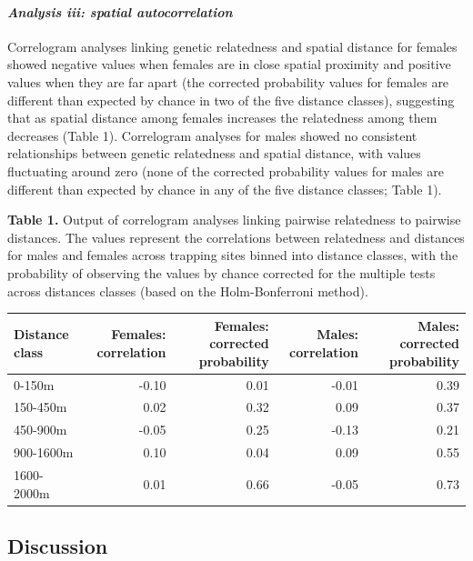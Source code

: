 \documentclass[]{article}
\let\oldparagraph\paragraph
\renewcommand{\paragraph}[1]{\oldparagraph{#1}\mbox{}}
\begin{document}
\hypertarget{analysis-iii-spatial-autocorrelation-1}{%
\paragraph{\texorpdfstring{\emph{Analysis iii: spatial
autocorrelation}}{Analysis iii: spatial autocorrelation}}\label{analysis-iii-spatial-autocorrelation-1}}

Correlogram analyses linking genetic relatedness and spatial distance
for females showed negative values when females are in close spatial
proximity and positive values when they are far apart (the corrected
probability values for females are different than expected by chance in
two of the five distance classes), suggesting that as spatial distance
among females increases the relatedness among them decreases (Table 1).
Correlogram analyses for males showed no consistent relationships
between genetic relatedness and spatial distance, with values
fluctuating around zero (none of the corrected probability values for
males are different than expected by chance in any of the five distance
classes; Table 1).

\textbf{Table 1.} Output of correlogram analyses linking pairwise
relatedness to pairwise distances. The values represent the correlations
between relatedness and distances for males and females across trapping
sites binned into distance classes, with the probability of observing
the values by chance corrected for the multiple tests across distances
classes (based on the Holm-Bonferroni method).

\begin{longtable}[]{@{}lrrrr@{}}
\toprule
Distance class & Females: correlation & Females: corrected probability &
Males: correlation & Males: corrected probability\tabularnewline
\midrule
\endhead
0-150m & -0.10 & 0.01 & -0.01 & 0.39\tabularnewline
150-450m & 0.02 & 0.32 & 0.09 & 0.37\tabularnewline
450-900m & -0.05 & 0.25 & -0.13 & 0.21\tabularnewline
900-1600m & 0.10 & 0.04 & 0.09 & 0.55\tabularnewline
1600-2000m & 0.01 & 0.66 & -0.05 & 0.73\tabularnewline
\bottomrule
\end{longtable}

\newpage

\hypertarget{discussion}{%
\subsection{Discussion}\label{discussion}}
\end{document}
